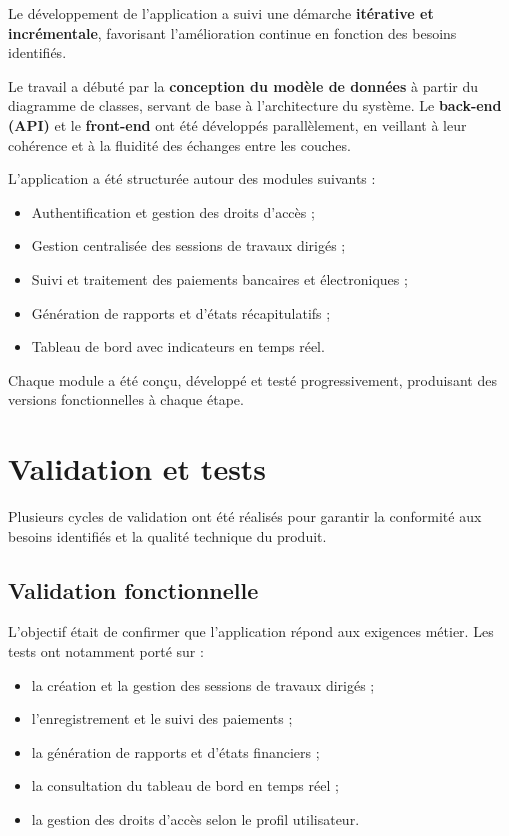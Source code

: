Le développement de l'application a suivi une démarche 
\textbf{itérative et incrémentale}, favorisant l'amélioration continue 
en fonction des besoins identifiés.

Le travail a débuté par la \textbf{conception du modèle de données} à 
partir du diagramme de classes, servant de base à l'architecture du 
système. Le \textbf{back-end (API)} et le \textbf{front-end} ont été 
développés parallèlement, en veillant à leur cohérence et à la fluidité 
des échanges entre les couches.

L'application a été structurée autour des modules suivants :

\begin{itemize}
    \item Authentification et gestion des droits d'accès ;
    \item Gestion centralisée des sessions de travaux dirigés ;
    \item Suivi et traitement des paiements bancaires et électroniques ;
    \item Génération de rapports et d'états récapitulatifs ;
    \item Tableau de bord avec indicateurs en temps réel.
\end{itemize}

Chaque module a été conçu, développé et testé progressivement, produisant 
des versions fonctionnelles à chaque étape.

\section{Validation et tests}

Plusieurs cycles de validation ont été réalisés pour garantir la 
conformité aux besoins identifiés et la qualité technique du produit.

\subsection{Validation fonctionnelle}

L'objectif était de confirmer que l'application répond aux exigences 
métier. Les tests ont notamment porté sur :

\begin{itemize}
    \item la création et la gestion des sessions de travaux dirigés ;
    \item l'enregistrement et le suivi des paiements ;
    \item la génération de rapports et d'états financiers ;
    \item la consultation du tableau de bord en temps réel ;
    \item la gestion des droits d'accès selon le profil utilisateur.
\end{itemize}

